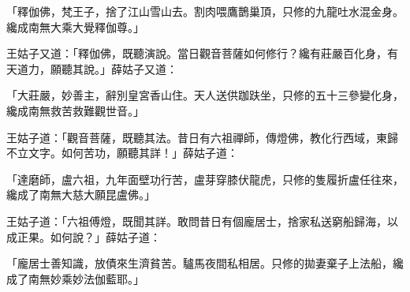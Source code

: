 \begin{showcontents}{}
「釋伽佛，梵王子，捨了江山雪山去。割肉喂鷹鵲巢頂，只修的九龍吐水混金身。纔成南無大乘大覺釋伽尊。」

王姑子又道：「釋伽佛，既聽演說。當日觀音菩薩如何修行？纔有莊嚴百化身，有天道力，願聽其說。」薛姑子又道：

「大莊嚴，妙善主，辭別皇宮香山住。天人送供跏趺坐，只修的五十三參變化身，纔成南無救苦救難觀世音。」

王姑子道：「觀音菩薩，既聽其法。昔日有六祖禪師，傳燈佛，教化行西域，東歸不立文字。如何苦功，願聽其詳！」薛姑子道：

「達磨師，盧六祖，九年面壁功行苦，盧芽穿膝伏龍虎，只修的隻履折盧任往來，纔成了南無大慈大願昆盧佛。」

王姑子道：「六祖傅燈，既聞其詳。敢問昔日有個龐居士，捨家私送窮船歸海，以成正果。如何說？」薛姑子道：

「龐居士善知識，放債來生濟貧苦。驢馬夜間私相居。只修的拋妻棄子上法船，纔成了南無妙乘妙法伽藍耶。」


\end{showcontents}
